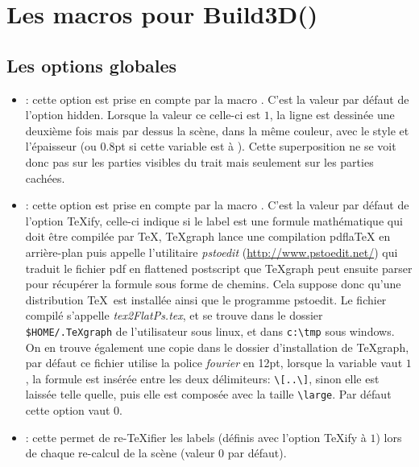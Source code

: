 \section{Les macros pour Build3D()}\label{mac4Build3D}

\subsection{Les options globales}

\begin{itemize}
 \item {}: cette option est prise en compte par la macro . C'est la valeur par défaut de l'option \textcolor{\coloropt}{hidden}. Lorsque la valeur ce celle-ci est $1$, la ligne est dessinée une deuxième fois mais par dessus la scène, dans la même couleur, avec le style  et l'épaisseur  (ou $0.8$pt si cette variable est à \Nil). Cette superposition ne se voit donc pas sur les parties visibles du trait mais seulement sur les parties cachées.
 \item {}:\label{optTeXifyLabels} cette option est prise en compte par la macro . C'est la valeur par défaut de l'option \textcolor{\coloropt}{TeXify}, celle-ci indique si le label est une formule mathématique qui doit être compilée par \TeX, TeXgraph lance une compilation pdflaTeX en arrière-plan puis appelle l'utilitaire \textit{pstoedit} (\url{http://www.pstoedit.net/}) qui traduit le fichier pdf en flattened postscript que TeXgraph peut ensuite parser pour récupérer la formule sous forme de chemins. Cela suppose donc qu'une distribution \TeX\ est installée ainsi que le programme pstoedit. Le fichier compilé s'appelle \textit{tex2FlatPs.tex}, et se trouve dans le dossier \verb|$HOME/.TeXgraph| de l'utilisateur sous linux, et dans \verb|c:\tmp| sous windows. On en trouve également une copie dans le dossier d'installation de TeXgraph, par défaut ce fichier utilise la police \textit{fourier} en 12pt, lorsque la variable  vaut $1$, la formule est insérée entre les deux délimiteurs: \verb|\[..\]|, sinon elle est laissée telle quelle, puis elle est composée avec la taille \verb|\large|. Par défaut cette option vaut $0$.
 \item {}:\label{optcleanLabel} cette permet de \og re-TeXifier\fg{} les labels (définis avec l'option \textcolor{\coloropt}{TeXify} à $1$) lors de chaque re-calcul de la scène (valeur $0$ par défaut).
\end{itemize}


